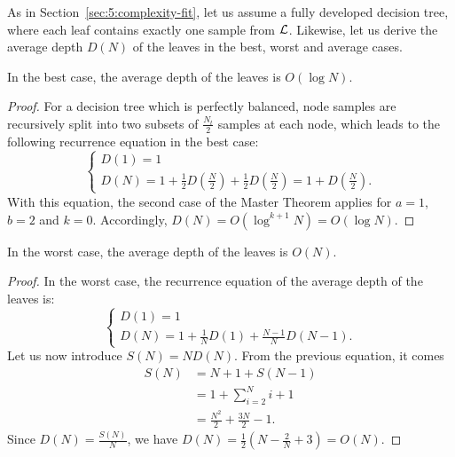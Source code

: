 As in Section~\ref{sec:5:complexity-fit}, let us assume a fully developed
decision tree, where each leaf contains exactly one sample from ${\cal L}$.
Likewise, let us derive the average depth $D(N)$ of the leaves in the best,
worst and average cases.

\begin{theorem}\label{thm:6:best:depth}
In the best case, the average depth of the leaves is $O(\log N)$.
\end{theorem}

\begin{proof}
For a decision tree which is perfectly balanced, node samples are recursively split
into two subsets of $\tfrac{N_t}{2}$ samples at each node, which leads to the following
recurrence equation in the best case:
\begin{equation}
\begin{cases}
D(1) = 1 \\
D(N) = 1 + \frac{1}{2} D(\frac{N}{2}) + \frac{1}{2} D(\frac{N}{2}) = 1+D(\frac{N}{2}).
\end{cases}
\end{equation}
With this equation, the second case of the Master Theorem applies for $a=1$, $b=2$ and $k=0$.
Accordingly, $D(N)=O(\log^{k+1} N) = O(\log N)$.
\end{proof}

\begin{theorem}\label{thm:6:worst:depth}
In the worst case, the average depth of the leaves is $O(N)$.
\end{theorem}

\begin{proof}
In the worst case, the recurrence equation of the average depth of the leaves is:
\begin{equation}
\begin{cases}
D(1) = 1 \\
D(N) = 1 + \frac{1}{N} D(1) + \frac{N-1}{N} D(N-1).
\end{cases}
\end{equation}
Let us now introduce $S(N)=N D(N)$. From the previous equation, it comes
\begin{align}
S(N) &= N+1 + S(N-1) \nonumber \\
     &= 1+ \sum_{i=2}^N i + 1 \nonumber \\
     &= \frac{N^2}{2} + \frac{3N}{2} - 1.
\end{align}
Since $D(N) = \tfrac{S(N)}{N}$, we have $D(N) = \frac{1}{2} (N - \frac{2}{N} + 3) = O(N)$.
\end{proof}

